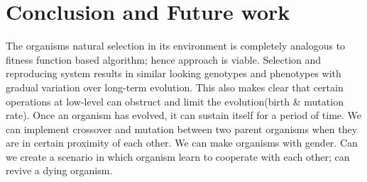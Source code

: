 \documentclass[conference]{IEEEtran}
\begin{document}
\section{Conclusion and Future work}
The organisms natural selection in its environment is completely analogous to fitness function based algorithm; hence approach is viable. Selection and reproducing system results in similar looking genotypes and phenotypes with gradual variation over long-term evolution. This also makes clear that certain operations at low-level can obstruct and limit the evolution(birth \& mutation rate). Once an organism has evolved, it can sustain itself for a period of time. We can implement crossover and mutation between two parent organisms when they are in certain proximity of each other. We can make organisms with gender. Can we create a scenario in which organism learn to cooperate with each other; can revive a dying organism.
\end{document}
